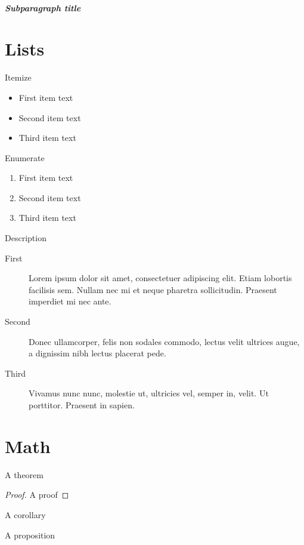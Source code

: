 \documentclass[italian,english]{uniud}
\begin{document}
\blindtext

\subparagraph{Subparagraph title}

\blindtext

\section{Lists}


Itemize
\begin{itemize}
\item First item text
\item Second item text
\item Third item text
\end{itemize}
Enumerate
\begin{enumerate}
\item First item text
\item Second item text
\item Third item text
\end{enumerate}
Description
\begin{description}
\item[First] 
	Lorem ipsum dolor sit amet, consectetuer adipiscing elit. Etiam lobortis facilisis sem. Nullam nec mi et neque pharetra sollicitudin. Praesent imperdiet mi nec ante.
\item[Second] 
	 Donec ullamcorper, felis non sodales commodo, lectus velit ultrices augue, a dignissim nibh lectus placerat pede.
\item[Third] 
	Vivamus nunc nunc, molestie ut, ultricies vel, semper in, velit. Ut porttitor. Praesent in sapien.
\end{description}


\section{Math}

\begin{theorem}
	\label{a-theorem}
	A theorem
\end{theorem}

\begin{proof}
	A proof
\end{proof}

\begin{corollary}
	\label{a-corollary}
	A corollary
\end{corollary}

\begin{proposition}
	\label{a-proposition}
	A proposition
\end{proposition}
\end{document}

